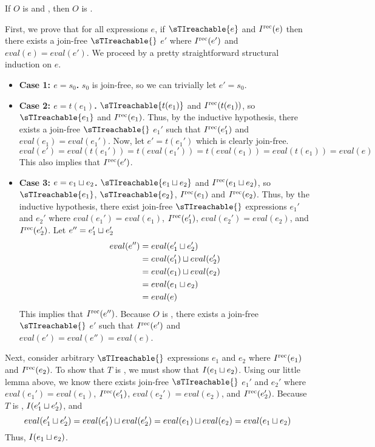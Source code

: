 \begin{claim}
  If $O$ is \dsTIconfluent{} and \dsTIreducible, then $O$ is \sTIconfluent.
\end{claim}
\begin{elidableproof}
  First, we prove that for all expressions $e$, if $\sTIreachable{e}$ and
  $I^{\text{rec}}(e)$ then there exists a join-free $\sTIreachable{}$ $e'$ where
  $I^{\text{rec}}(e')$ and $eval(e) = eval(e')$. We proceed by a pretty straightforward
  structural induction on $e$.
  \begin{itemize}
    \item \textbf{Case 1: $e = s_0$.}
      $s_0$ is join-free, so we can trivially let $e' = s_0$.

    \item \textbf{Case 2: $e = t(e_1)$.}
      $\sTIreachable{t(e_1)}$ and $I^{\text{rec}}(t(e_1))$, so $\sTIreachable{e_1}$ and
      $I^{\text{rec}}(e_1)$. Thus, by the inductive hypothesis, there exists a join-free
      $\sTIreachable{}$ $e_1'$ such that $I^{\text{rec}}(e_1')$ and $eval(e_1) =
      eval(e_1')$. Now, let $e' = t(e_1')$ which is clearly join-free.
      \[
        eval(e')
          = eval(t(e_1'))
          = t(eval(e_1'))
          = t(eval(e_1))
          = eval(t(e_1))
          = eval(e)
      \]
      This also implies that $I^{\text{rec}}(e')$.

    \item \textbf{Case 3: $e = e_1 \sqcup e_2$.}
      $\sTIreachable{e_1 \join e_2}$ and $I^{\text{rec}}(e_1 \sqcup e_2)$, so
      $\sTIreachable{e_1}$, $\sTIreachable{e_2}$, $I^{\text{rec}}(e_1)$ and
      $I^{\text{rec}}(e_2)$. Thus, by the inductive hypothesis, there exist join-free
      $\sTIreachable{}$ expressions $e_1'$ and $e_2'$ where $eval(e_1') =
      eval(e_1)$, $I^{\text{rec}}(e_1')$, $eval(e_2') = eval(e_2)$, and $I^{\text{rec}}(e_2')$.
      Let $e'' = e_1' \sqcup e_2'$
      \begin{align*}
        eval(e'')
        &= eval(e_1' \sqcup e_2') \\
        &= eval(e_1') \sqcup eval(e_2') \\
        &= eval(e_1) \sqcup eval(e_2) \\
        &= eval(e_1 \sqcup e_2) \\
        &= eval(e)
      \end{align*}
      This implies that $I^{\text{rec}}(e'')$. Because $O$ is \dsTIreducible, there
      exists a join-free $\sTIreachable{}$ $e'$ such that $I^{\text{rec}}(e')$ and
      $eval(e') = eval(e'') = eval(e)$.
  \end{itemize}

  Next, consider arbitrary $\sTIreachable{}$ expressions $e_1$ and $e_2$ where
  $I^{\text{rec}}(e_1)$ and $I^{\text{rec}}(e_2)$. To show that $T$ is \sTIconfluent, we must
  show that $I(e_1 \sqcup e_2)$. Using our little lemma above, we know there
  exists join-free $\sTIreachable{}$ $e_1'$ and $e_2'$ where $eval(e_1') =
  eval(e_1)$, $I^{\text{rec}}(e_1')$, $eval(e_2') = eval(e_2)$, and $I^{\text{rec}}(e_2')$.
  Because $T$ is \dsTIconfluent, $I(e_1' \sqcup e_2')$, and
  \[
    eval(e_1' \sqcup e_2')
      = eval(e_1') \sqcup eval(e_2')
      = eval(e_1) \sqcup eval(e_2)
      = eval(e_1 \sqcup e_2)
  \]
  Thus, $I(e_1 \sqcup e_2)$.
\end{elidableproof}

